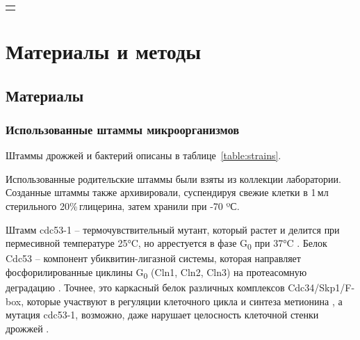 \begin{table}[h]
	\small
	\caption{}
	\label{table:}
	\begin{tabular}{p{0.3\width}}
	\graytable
	\toprule
	\midrule
	\bottomrule
	\end{tabular}
\end{table}




\section{Материалы и методы}
\subsection{Материалы}



\subsubsection{Использованные штаммы микроорганизмов}
\label{subsec:strains}

Штаммы дрожжей и бактерий описаны в таблице~\ref{table:strains}.

Использованные родительские штаммы были взяты из коллекции лаборатории. Созданные штаммы также архивировали, суспендируя свежие клетки в 1\,мл стерильного 20\%\,глицерина, затем хранили при -70 ºС.

Штамм cdc53-1 -- термочувствительный мутант, который растет и делится при пермесивной температуре 25°C, но аррестуется в фазе G\textsubscript{0} при 37°C \cite{mathias_cdc53p_1996}. Белок Cdc53 -- компонент убиквитин-лигазной системы, которая направляет фосфорилированные циклины  G\textsubscript{0} (Cln1, Cln2, Cln3) на протеасомную деградацию \cite{willems_cdc53_1996}. Точнее, это каркасный белок различных комплексов Cdc34/Skp1/F-box, которые участвуют в регуляции клеточного цикла и синтеза метионина \cite{patton_cdc53_1998}, а мутация cdc53-1, возможно, даже нарушает целосность клеточной стенки дрожжей \cite{varelas_cdc34/scf_2006}.

